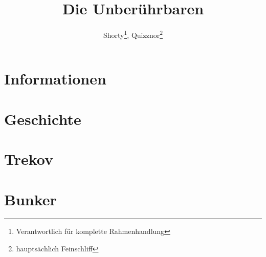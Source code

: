 \documentclass{include/protokollclass}
\title{Die Unberührbaren}
\author{Shorty\thanks{Verantwortlich für komplette Rahmenhandlung}, Quizznor\thanks{hauptsächlich Feinschliff}}
\begin{document}
\maketitle
\tableofcontents

\chapter{Informationen}


\chapter{Geschichte}


\chapter{Trekov}


\chapter{Bunker}

\end{document}
